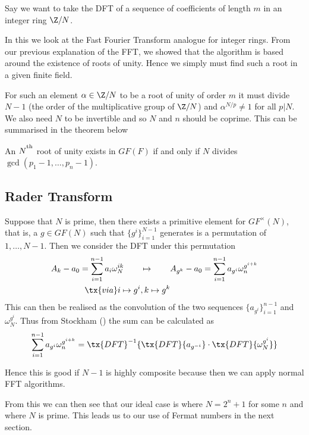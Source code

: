 Say we want to take the DFT of a sequence of coefficients of length $m$ in an integer ring $\Z/N$.

In this we look at the Fast Fourier Transform analogue for integer rings. From our previous explanation of the FFT, we showed that the algorithm is based around the existence of roots of unity. Hence we simply must find such a root in a given finite field.

For such an element $\alpha \in \Z/N$ to be a root of unity of order $m$ it must divide $N - 1$ (the order of the multiplicative group of $\Z/N$) and $\alpha^{N/p} \neq 1$ for all $p | N$. We also need $N$ to be invertible and so $N$ and $n$ should be coprime. This can be summarised in the theorem below

\begin{theorem}
  An $N^\textsuperscript{\textup{th}}$ root of unity exists in $GF(F)$ if and only if $N$ divides $\gcd(p_1 - 1, \ldots, p_n - 1)$.
\end{theorem}


\subsection{Rader Transform}
\label{subsec:rt}

\begin{theorem}\label{rader-tranform}
    Suppose that $N$ is prime, then there exists a primitive element for $GF^\times(N)$, that is, a $g \in GF(N)$ such that $\{g^i\}_{i=1}^{N-1}$ generates is a permutation of $1, \ldots, N-1$. Then we consider the DFT under this permutation
    \begin{align*}
      A_k - a_0 = \sum^{n-1}_{i=1} a_i \omega_N^{ik} \qquad &\mapsto \qquad A_{g^k} - a_0 = \sum^{n-1}_{i=1} a_{g^i}\omega_n^{g^{i+k}}\\
      \tx{ via } i \mapsto g^i&, k \mapsto g^k
    \end{align*}
    This can then be realised as the convolution of the two sequences $\{a_{g^i}\}_{i=1}^{n-1}$ and $\omega_N^{g^i}$. Thus from Stockham (\cite{stockham}) the sum can be calculated as
    \[
      \sum^{n-1}_{i=1} a_{g^i}\omega_n^{g^{i+k}} = \tx{DFT}^{-1}\{\tx{DFT}\{a_{g^{-i}}\}\cdot \tx{DFT}\{\omega_N^{g^i}\}\}
    \]
\end{theorem}
Hence this is good if $N - 1$ is highly composite because then we can apply normal FFT algorithms.

From this we can then see that our ideal case is where $N = 2^n + 1$ for some $n$ and where $N$ is prime. This leads us to our use of Fermat numbers in the next section.

